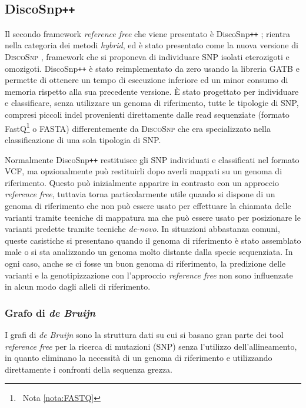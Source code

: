 \documentclass[../main.tex]{subfiles}
\begin{document}
\subsection{DiscoSnp\texttt{++}}
\label{discosnp++}

Il secondo framework \textit{reference free} che viene presentato è DiscoSnp\texttt{++} \cite{peterlongo2017discosnp++}; rientra nella categoria dei metodi \textit{hybrid}, ed è stato presentato come la nuova versione di \textsc{DiscoSnp} \cite{uricaru2015reference}, framework che si proponeva di individuare SNP isolati eterozigoti e omozigoti. DiscoSnp\texttt{++} è stato reimplementato da zero usando la libreria GATB \cite{drezen2014gatb} e permette di ottenere un tempo di esecuzione inferiore ed un minor consumo di memoria rispetto alla sua precedente versione. È stato progettato per individuare e classificare, senza utilizzare un genoma di riferimento, tutte le tipologie di SNP, compresi piccoli indel provenienti direttamente dalle read sequenziate (formato FastQ\footnote{\ Nota \vref{nota:FASTQ}} o FASTA) differentemente da \textsc{DiscoSnp} che era specializzato nella classificazione di una sola tipologia di SNP.

Normalmente DiscoSnp\texttt{++} restituisce gli SNP individuati e classificati nel formato VCF, ma opzionalmente può restituirli dopo averli mappati su un genoma di riferimento. Questo può inizialmente apparire in contrasto con un approccio \textit{reference free}, tuttavia torna particolarmente utile quando si dispone di un genoma di riferimento che non può essere usato per effettuare la chiamata delle varianti tramite tecniche di mappatura ma che può essere usato per posizionare le varianti predette tramite tecniche \textit{de-novo}. In situazioni abbastanza comuni, queste casistiche si presentano quando il genoma di riferimento è stato assemblato male o si sta analizzando un genoma molto distante dalla specie sequenziata. In ogni caso, anche se ci fosse un buon genoma di riferimento, la predizione delle varianti e la genotipizzazione con l'approccio \textit{reference free} non sono influenzate in alcun modo dagli alleli di riferimento.

\subsubsection{Grafo di \textit{de Bruijn}}
\label{dBG}

I grafi di \textit{de Bruijn} sono la struttura dati su cui si basano gran parte dei tool \textit{reference free} per la  ricerca di mutazioni (SNP) senza l'utilizzo dell'allineamento, in quanto eliminano la necessità di un genoma di riferimento e utilizzando direttamente i confronti della sequenza grezza.
\end{document}
